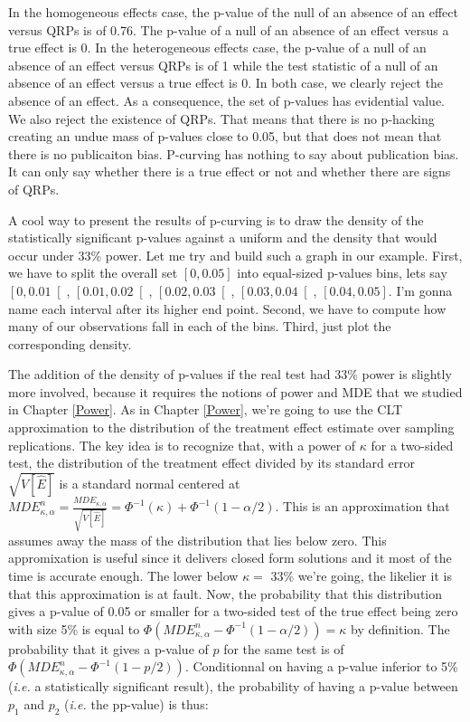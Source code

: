 \documentclass[]{book}
\theoremstyle{definition}
\theoremstyle{definition}
\theoremstyle{definition}
\theoremstyle{remark}
\begin{document}
In the homogeneous effects case, the p-value of the null of an absence of an effect versus QRPs is of 0.76.
The p-value of a null of an absence of an effect versus a true effect is 0.
In the heterogeneous effects case, the p-value of a null of an absence of an effect versus QRPs is of 1 while the test statistic of a null of an absence of an effect versus a true effect is 0.
In both case, we clearly reject the absence of an effect.
As a consequence, the set of p-values has evidential value.
We also reject the existence of QRPs.
That means that there is no p-hacking creating an undue mass of p-values close to 0.05, but that does not mean that there is no publicaiton bias.
P-curving has nothing to say about publication bias.
It can only say whether there is a true effect or not and whether there are signs of QRPs.

A cool way to present the results of p-curving is to draw the density of the statistically significant p-values against a uniform and the density that would occur under 33\% power.
Let me try and build such a graph in our example.
First, we have to split the overall set \(\left[0,0.05\right]\) into equal-sized p-values bins, lets say \(\left[0,0.01\right[\), \(\left[0.01,0.02\right[\), \(\left[0.02,0.03\right[\), \(\left[0.03,0.04\right[\), \(\left[0.04,0.05\right]\).
I'm gonna name each interval after its higher end point.
Second, we have to compute how many of our observations fall in each of the bins.
Third, just plot the corresponding density.

The addition of the density of p-values if the real test had 33\% power is slightly more involved, because it requires the notions of power and MDE that we studied in Chapter \ref{Power}.
As in Chapter \ref{Power}, we're going to use the CLT approximation to the distribution of the treatment effect estimate over sampling replications.
The key idea is to recognize that, with a power of \(\kappa\) for a two-sided test, the distribution of the treatment effect divided by its standard error \(\sqrt{V[\hat{E}]}\) is a standard normal centered at \(MDE^n_{\kappa,\alpha}=\frac{MDE_{\kappa,\alpha}}{\sqrt{V[\hat{E}]}}=\Phi^{-1}(\kappa)+\Phi^{-1}(1-\alpha/2)\).
This is an approximation that assumes away the mass of the distribution that lies below zero.
This appromixation is useful since it delivers closed form solutions and it most of the time is accurate enough.
The lower below \(\kappa=\) 33\% we're going, the likelier it is that this approximation is at fault.
Now, the probability that this distribution gives a p-value of 0.05 or smaller for a two-sided test of the true effect being zero with size 5\% is equal to \(\Phi(MDE^n_{\kappa,\alpha}-\Phi^{-1}(1-\alpha/2))=\kappa\) by definition.
The probability that it gives a p-value of \(p\) for the same test is of \(\Phi(MDE^n_{\kappa,\alpha}-\Phi^{-1}(1-p/2))\).
Conditionnal on having a p-value inferior to 5\% (\textit{i.e.} a statistically significant result), the probability of having a p-value between \(p_1\) and \(p_2\) (\textit{i.e.} the pp-value) is thus:
\end{document}
